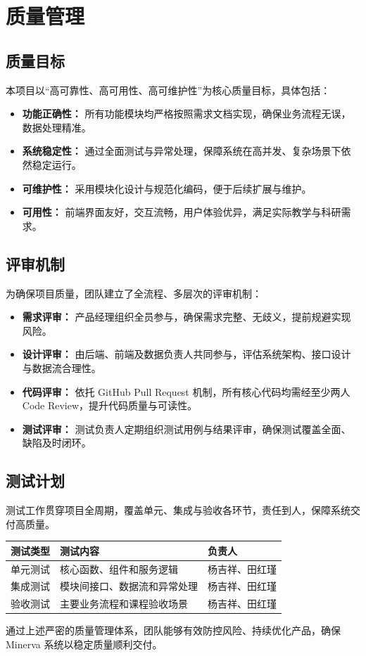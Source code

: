 \section{质量管理}

\subsection{质量目标}

本项目以“高可靠性、高可用性、高可维护性”为核心质量目标，具体包括：
\begin{itemize}
	\item \textbf{功能正确性：} 所有功能模块均严格按照需求文档实现，确保业务流程无误，数据处理精准。
	\item \textbf{系统稳定性：} 通过全面测试与异常处理，保障系统在高并发、复杂场景下依然稳定运行。
	\item \textbf{可维护性：} 采用模块化设计与规范化编码，便于后续扩展与维护。
	\item \textbf{可用性：} 前端界面友好，交互流畅，用户体验优异，满足实际教学与科研需求。
\end{itemize}

\subsection{评审机制}

为确保项目质量，团队建立了全流程、多层次的评审机制：
\begin{itemize}
	\item \textbf{需求评审：} 产品经理组织全员参与，确保需求完整、无歧义，提前规避实现风险。
	\item \textbf{设计评审：} 由后端、前端及数据负责人共同参与，评估系统架构、接口设计与数据流合理性。
	\item \textbf{代码评审：} 依托 GitHub Pull Request 机制，所有核心代码均需经至少两人 Code Review，提升代码质量与可读性。
	\item \textbf{测试评审：} 测试负责人定期组织测试用例与结果评审，确保测试覆盖全面、缺陷及时闭环。
\end{itemize}

\subsection{测试计划}

测试工作贯穿项目全周期，覆盖单元、集成与验收各环节，责任到人，保障系统交付高质量。

\begin{longtable}{|p{32mm}|p{72mm}|p{44mm}|}
\hline
\textbf{测试类型} & \textbf{测试内容} & \textbf{负责人} \\
\hline
单元测试 & 核心函数、组件和服务逻辑 & 杨吉祥、田红瑾 \\
\hline
集成测试 & 模块间接口、数据流和异常处理 & 杨吉祥、田红瑾 \\
\hline
验收测试 & 主要业务流程和课程验收场景 & 杨吉祥、田红瑾 \\
\hline
\end{longtable}

通过上述严密的质量管理体系，团队能够有效防控风险、持续优化产品，确保 Minerva 系统以稳定质量顺利交付。

